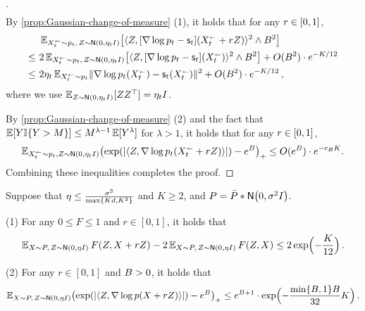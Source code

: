 \begin{proof}[]
\begin{align*}
\end{align*}
By \cref{prop:Gaussian-change-of-measure} (1), it holds that for any $\lr\in[0,1]$,
\begin{align*}
    &~\En_{\xr{t}\sim p_t,\, Z\sim \normal{0,\eta_t\Id}}\brk*{ \tri{Z,[\nabla \log p_t-\scf_t](\xr{t}+\lr Z)}^2\wedge \B^2 } \\
    \leq&~ 2\En_{\xr{t}\sim p_t,\,Z\sim \normal{0,\eta_t\Id}}\brk*{ \tri{Z,[\nabla \log p_t-\scf_t](\xr{t})}^2\wedge \B^2 }+O(\B^2)\cdot e^{-K/12} \\
    \leq&~ 2\eta_t \En_{\xr{t}\sim p_t}\nrm{\nabla \log p_t(\xr{t})-\scf_t(\xr{t})}^2+O(\B^2)\cdot e^{-K/12}\,,
\end{align*}
where we use $\En_{Z\sim \normal{0,\eta_t\Id}}[ZZ^\top]=\eta_t\Id$. 

By \cref{prop:Gaussian-change-of-measure} (2) and the fact that $\En[Y\indic\crl{Y>M}]\leq M^{\lambda-1}\En[Y^\lambda]$ for $\lambda>1$, it holds that for any $\lr\in[0,1]$,
\begin{align*}
    \En_{\xr{t}\sim p_t, Z\sim \normal{0,\eta_t\Id}}\prn*{ \exp\prn*{\abs{\tri{Z,\nabla \log p_t(\xr{t}+\lr Z)}}} - e^\B }_+\leq O(e^\B)\cdot e^{-c_\B K}.
\end{align*}
Combining these inequalities completes the proof.
\end{proof}

\newcommand{\px}{p_X}
\newcommand{\py}{p_Y}
\newcommand{\pxy}{p_{X\mid Y}}

\begin{proposition}\label{prop:Gaussian-change-of-measure}
Suppose that $\eta\leq \frac{\sigma^2}{\max\crl{Kd,K^2}}$ and $K\geq 2$, and $P=\bar P*\Nsigma$.


(1) For any $0\leq F\leq 1$ and $r\in[0,1]$, it holds that
\begin{align*}
    \En_{X\sim P,\, Z\sim \normal{0,\eta\Id}} F(Z,X+rZ)
    -2\En_{X\sim P,\, Z\sim \normal{0,\eta\Id}} F(Z,X)\leq 2\exp\prn[\Big]{-\frac{K}{12}}\,.
\end{align*}

(2) For any $r\in[0,1]$ and $\B>0$, it holds that
\begin{align*}
    \En_{X\sim P,\, Z\sim \normal{0,\eta\Id}} \prn*{\exp\prn*{ \abs*{\tri{Z, \nabla \log p(X+r Z)}} } -e^\B}_+ \leq e^{\B+1}\cdot \exp\prn[\Big]{-\frac{\min\crl{\B,1}\B}{32}K}\,.
\end{align*}


\end{proposition}

